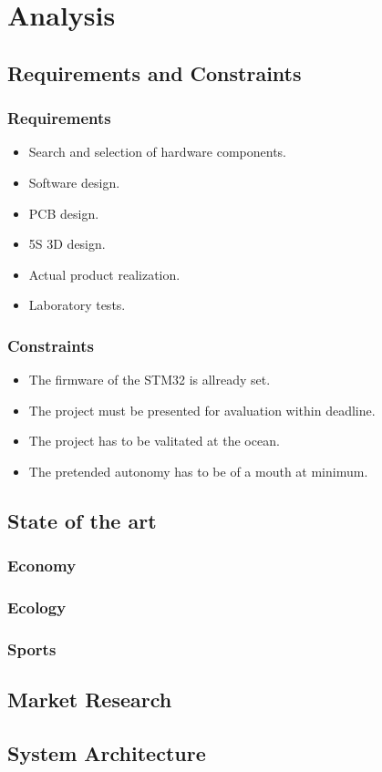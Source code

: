 \chapter{Analysis}
\section{Requirements and Constraints}
\subsection{Requirements}
\begin{itemize}
    \item Search and selection of hardware components.
    \item Software design.
    \item PCB design.
    \item 5S 3D design.
    \item Actual product realization.
    \item Laboratory tests.
\end{itemize}
\subsection{Constraints}
\begin{itemize}
    \item The firmware of the STM32 is allready set.
    \item The project must be presented for avaluation within deadline.
    \item The project has to be valitated at the ocean.
    \item The pretended autonomy has to be of a mouth at minimum.
\end{itemize}
\section{State of the art}
\subsection{Economy}
\subsection{Ecology}
\subsection{Sports}
\section{Market Research}
\section{System Architecture}